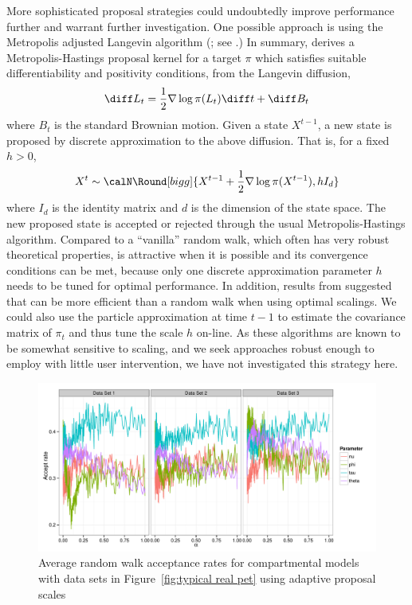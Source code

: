 More sophisticated proposal strategies could undoubtedly improve performance
further and warrant further investigation. One possible approach is using the
Metropolis adjusted Langevin algorithm (\mala; see \cite{Roberts:1996vd}.) In
summary, \mala derives a Metropolis-Hastings proposal kernel for a target
$\pi$ which satisfies suitable differentiability and positivity conditions,
from the Langevin diffusion,
\begin{equation*}
  \diff L_t = \frac{1}{2}\nabla\log\pi(L_t)\diff t + \diff B_t
\end{equation*}
where $B_t$ is the standard Brownian motion. Given a state $X^{t-1}$, a new
state is proposed by discrete approximation to the above diffusion. That is,
for a fixed $h>0$,
\begin{equation}
  X^t\sim\calN\Round[bigg]{X^{t-1}+\frac{1}{2}\nabla\log\pi(X^{t-1}), hI_d}
\end{equation}
where $I_d$ is the identity matrix and $d$ is the dimension of the state
space. The new proposed state is accepted or rejected through the usual
Metropolis-Hastings algorithm. Compared to a ``vanilla'' random walk, which
often has very robust theoretical properties, \mala is attractive when it is
possible and its convergence conditions \cite{Roberts:1996vd} can be met,
because only one discrete approximation parameter $h$ needs to be tuned for
optimal performance. In addition, results from \cite{Roberts:2001ta} suggested
that \mala can be more efficient than a random walk when using optimal
scalings. We could also use the particle approximation at time $t - 1$ to
estimate the covariance matrix of $\pi_t$ and thus tune the scale $h$ on-line.
As these algorithms are known to be somewhat sensitive to scaling, and we seek
approaches robust enough to employ with little user intervention, we have not
investigated this strategy here.

\begin{figure}[t]
  \includegraphics[width=\linewidth]{fig/Adaptive_Proposal}
  \caption[Acceptance rates of adaptive \protect\smc algorithms]
  {Average random walk acceptance rates for \pet compartmental models
    with data sets in Figure~\ref{fig:typical real pet} using adaptive
    proposal scales}
  \label{fig:pet adaptive proposal}
\end{figure}

